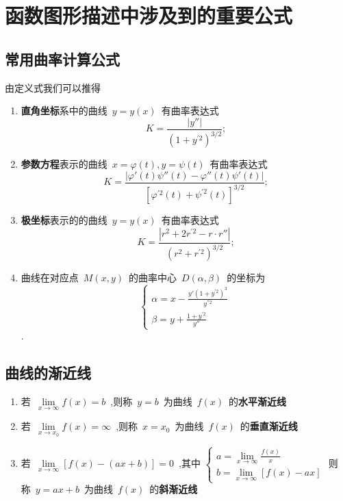 \documentclass[10pt,a4paper]{article}
\begin{document}
\section{函数图形描述中涉及到的重要公式}
\subsection{常用曲率计算公式}
由定义式我们可以推得
\begin{enumerate}
    \item \textbf{直角坐标}系中的曲线\ $y=y(x)$\ 有曲率表达式
          \begin{equation}
              K=\frac{\left|y''\right|}{\left( 1+y^{'2} \right)^{3/2}}\mbox{;}
          \end{equation}
    \item \textbf{参数方程}表示的曲线\ $x=\varphi(t),y=\psi(t) $\ 有曲率表达式
          \begin{equation}
              K=\frac{\left|\varphi'(t)\psi''(t)-\varphi''(t)\psi'(t)\right|}{\left[ \varphi^{'2}(t) +\psi^{'2}(t) \right]^{3/2}}\mbox{;}
          \end{equation}
    \item \textbf{极坐标}表示的的曲线\ $y=y(x)$\ 有曲率表达式
          \begin{equation}
              K=\frac{\left|r^2+2r^{'2}-r\cdot r''\right|}{\left(r^2+r^{'2}\right)^{3/2}}\mbox{;}
          \end{equation}
    \item 曲线在对应点\ $M(x,y)$\ 的曲率中心\ $D(\alpha,\beta)$\ 的坐标为
          \begin{equation}
              \begin{cases}
                  \alpha=x-\displaystyle\frac{y'(1+y^{'2})^3}{y^{''2}} \\[7pt]
                  \beta=y+\displaystyle\frac{1+y^{'2}}{y''}
              \end{cases}
          \end{equation}
          .
\end{enumerate}
\subsection{曲线的渐近线}
\begin{enumerate}
    \item 若\ $\lim\limits_{ x\rightarrow \infty }f(x)=b$\ ,则称\ $y=b$\ 为曲线\ $f(x)$\ 的\textbf{水平渐近线}
    \item 若\ $\lim\limits_{ x\rightarrow x_0 }f(x)=\infty$\ ,则称\ $x=x_0$\ 为曲线\ $f(x)$\ 的\textbf{垂直渐近线}
    \item 若\ $\lim\limits_{ x\rightarrow \infty }[f(x)-(ax+b)]=0$\ ,其中
          $
              \begin{cases}
                  a=\displaystyle \lim\limits_{x\to \infty}\frac{f(x)}{x} \\[7pt]
                  b=\displaystyle \lim\limits_{x\to \infty}[f(x)-ax]
              \end{cases}
          $
          则称\ $y=ax+b$\ 为曲线\ $f(x)$\ 的\textbf{斜渐近线}
\end{enumerate}
\end{document}
